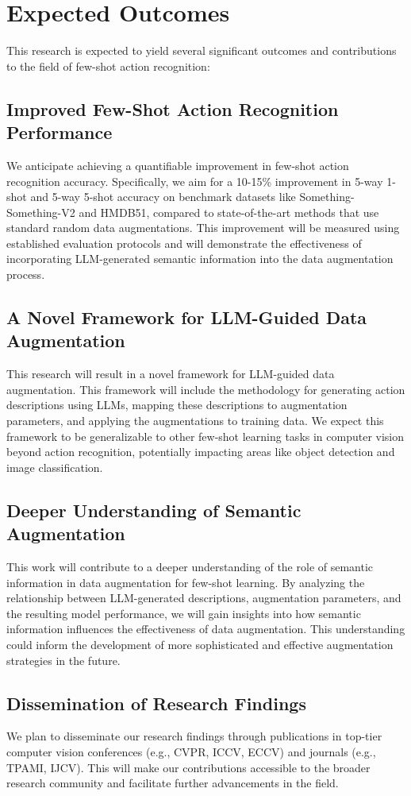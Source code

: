 \section{Expected Outcomes}


This research is expected to yield several significant outcomes and contributions to the field of few-shot action recognition:


\subsection{Improved Few-Shot Action Recognition Performance} 
We anticipate achieving a quantifiable improvement in few-shot action recognition accuracy. Specifically, we aim for a 10-15\% improvement in 5-way 1-shot and 5-way 5-shot accuracy on benchmark datasets like Something-Something-V2 and HMDB51, compared to state-of-the-art methods that use standard random data augmentations. This improvement will be measured using established evaluation protocols and will demonstrate the effectiveness of incorporating LLM-generated semantic information into the data augmentation process.

\subsection{A Novel Framework for LLM-Guided Data Augmentation}
This research will result in a novel framework for LLM-guided data augmentation. This framework will include the methodology for generating action descriptions using LLMs, mapping these descriptions to augmentation parameters, and applying the augmentations to training data. We expect this framework to be generalizable to other few-shot learning tasks in computer vision beyond action recognition, potentially impacting areas like object detection and image classification.

\subsection{Deeper Understanding of Semantic Augmentation} 
This work will contribute to a deeper understanding of the role of semantic information in data augmentation for few-shot learning. By analyzing the relationship between LLM-generated descriptions, augmentation parameters, and the resulting model performance, we will gain insights into how semantic information influences the effectiveness of data augmentation. This understanding could inform the development of more sophisticated and effective augmentation strategies in the future.

\subsection{Dissemination of Research Findings} We plan to disseminate our research findings through publications in top-tier computer vision conferences (e.g., CVPR, ICCV, ECCV) and journals (e.g., TPAMI, IJCV). This will make our contributions accessible to the broader research community and facilitate further advancements in the field.
